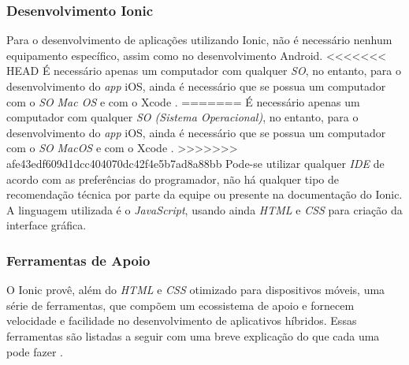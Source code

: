 \subsubsection{Desenvolvimento Ionic} \label{subsubsection:dev-ionic}
Para o desenvolvimento de aplicações utilizando Ionic, não é necessário nenhum equipamento específico, assim como no desenvolvimento Android.
<<<<<<< HEAD
É necessário apenas um computador com qualquer \textit{SO}, no entanto, para o desenvolvimento do \textit{app} iOS, ainda é necessário que se possua um computador com o \textit{SO} 
\textit{Mac OS} e com o Xcode \cite{drifty_installing_2016}.
=======
É necessário apenas um computador com qualquer \textit{SO (Sistema Operacional)}, no entanto, para o desenvolvimento do \textit{app} iOS, ainda é necessário que se possua um computador com o \textit{SO} 
\textit{MacOS} e com o Xcode \cite{drifty_installing_2016}.
>>>>>>> afe43edf609d1dcc404070dc42f4e5b7ad8a88bb
Pode-se utilizar qualquer \textit{IDE} de acordo com as preferências do programador, não há qualquer tipo de recomendação técnica por parte da equipe ou presente na documentação do Ionic.
A linguagem utilizada é o \textit{JavaScript}, usando ainda \textit{HTML} e \textit{CSS} para criação da interface gráfica.

\subsubsection{Ferramentas de Apoio} \label{subsection:ionicferramentasapoio}

O Ionic provê, além do \textit{HTML} e \textit{CSS} otimizado para dispositivos móveis, 
uma série de ferramentas, que compõem um ecossistema de apoio e fornecem velocidade e facilidade no desenvolvimento de aplicativos híbridos. 
Essas ferramentas são listadas a seguir com uma breve explicação do que cada uma pode fazer \cite{drifty_ionic:_2016}.

